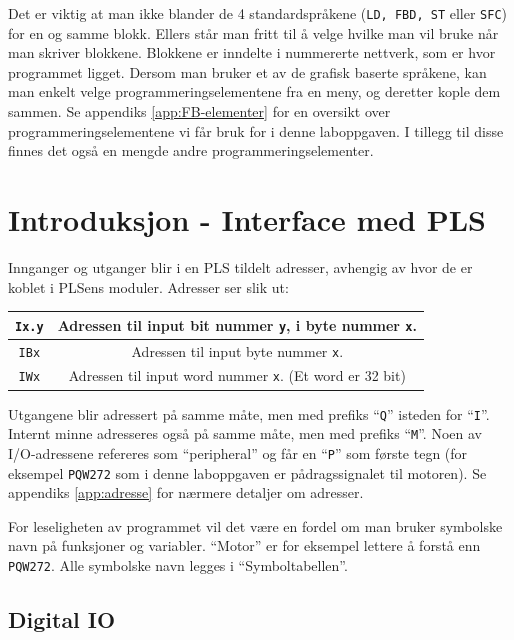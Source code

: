 \begin{alphasection}
Det er viktig at man ikke blander de 4 standardspråkene (\verb|LD, FBD, ST| eller \verb|SFC|) for en og samme blokk. Ellers står man fritt til å velge hvilke man vil bruke når man skriver blokkene. Blokkene er inndelte i nummererte nettverk, som er hvor programmet ligget. Dersom man bruker et av de grafisk baserte språkene, kan man enkelt velge programmeringselementene fra en meny, og deretter kople dem sammen. Se appendiks \ref{app:FB-elementer} for en oversikt over programmeringselementene vi får bruk for i denne laboppgaven. I tillegg til disse finnes det også en mengde andre programmeringselementer.





\section{Introduksjon - Interface med PLS}\label{subsec:intefrace}

Innganger og utganger blir i en PLS tildelt adresser, avhengig av hvor de er koblet i PLSens moduler. Adresser ser slik ut:

\begin{center}
 {\begin{tabular}{|c| c|} 
 \toprule
 \verb|Ix.y| & Adressen til input bit nummer \verb|y|, i
byte nummer \verb|x|.\\ 
 \toprule
 \verb|IBx| & Adressen til input byte nummer \verb|x|.  \\
 \toprule
 \verb|IWx| & Adressen til input word nummer \verb|x|.
(Et word er 32 bit)  \\

 \toprule
\end{tabular}}
\end{center}


Utgangene blir adressert på samme måte, men med prefiks “\verb|Q|” isteden for “\verb|I|”. Internt minne
adresseres også på samme måte, men med prefiks “\verb|M|”. Noen av I/O-adressene refereres som
“peripheral” og får en “\verb|P|” som første tegn (for eksempel \verb|PQW272| som i denne laboppgaven er
pådragssignalet til motoren). Se appendiks \ref{app:adresse} for nærmere detaljer om adresser.


For leseligheten av programmet vil det være en fordel om man bruker symbolske navn på
funksjoner og variabler. “Motor” er for eksempel lettere å forstå enn \verb|PQW272|. Alle symbolske navn
legges i “Symboltabellen”.

\subsection{Digital IO}


\end{alphasection}
